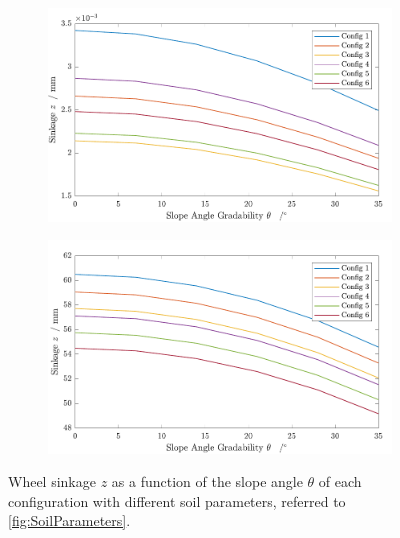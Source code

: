 \begin{figure}[htb]
     \centering
     \begin{subfigure}[b]{0.49\textwidth}
         \centering
         \includegraphics[width=\textwidth]{Media/Sinkage for each config in heavy clay.pdf}
         \label{fig:TIDElectronShielding}
     \end{subfigure}
     \hfill
     \begin{subfigure}[b]{0.49\textwidth}
         \centering
         \includegraphics[width=\textwidth]{Media/Sinkage for each config in snow (Sweden).pdf}
         \label{fig:TIDProtonShielding}
     \end{subfigure}
     \caption{Wheel sinkage \(z\) as a function of the slope angle \(\theta\) of each configuration with different soil parameters, referred to \autoref{fig:SoilParameters}.}
     \label{fig:Sinkage}
\end{figure}





